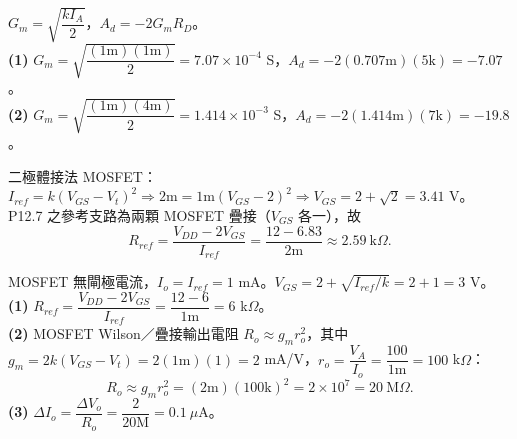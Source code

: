 \documentclass[12pt]{article}
\begin{document}
\sol $G_m=\sqrt{\dfrac{kI_A}{2}}$，$A_d=-2G_mR_D$。\\
\textbf{(1)} $G_m=\sqrt{\dfrac{(1\text{m})(1\text{m})}{2}}=7.07\times10^{-4}$ S，$A_d=-2(0.707\text{m})(5\text{k})=-7.07$。\\
\textbf{(2)} $G_m=\sqrt{\dfrac{(1\text{m})(4\text{m})}{2}}=1.414\times10^{-3}$ S，$A_d=-2(1.414\text{m})(7\text{k})=-19.8$。

\begin{minipage}{0.64\linewidth}
\end{minipage}\hfill
\begin{minipage}{0.33\linewidth}
\end{minipage}

\sol 二極體接法 MOSFET：$I_{ref}=k(V_{GS}-V_t)^2\Rightarrow 2\text{m}=1\text{m}(V_{GS}-2)^2\Rightarrow V_{GS}=2+\sqrt2=3.41$ V。
P12.7 之參考支路為兩顆 MOSFET 疊接（$V_{GS}$ 各一），故
\[ R_{ref}=\frac{V_{DD}-2V_{GS}}{I_{ref}}=\frac{12-6.83}{2\text{m}}\approx2.59\ \text{k}\Omega. \]

\sol MOSFET 無閘極電流，$I_o=I_{ref}=1$ mA。$V_{GS}=2+\sqrt{I_{ref}/k}=2+1=3$ V。\\
\textbf{(1)} $R_{ref}=\dfrac{V_{DD}-2V_{GS}}{I_{ref}}=\dfrac{12-6}{1\text{m}}=6$ k$\Omega$。\\
\textbf{(2)} MOSFET Wilson／疊接輸出電阻 $R_o\approx g_m r_o^2$，其中 $g_m=2k(V_{GS}-V_t)=2(1\text{m})(1)=2$ mA/V，$r_o=\dfrac{V_A}{I_o}=\dfrac{100}{1\text{m}}=100$ k$\Omega$：
\[ R_o\approx g_m r_o^2=(2\text{m})(100\text{k})^2=2\times10^{7}=20\ \text{M}\Omega. \]
\textbf{(3)} $\Delta I_o=\dfrac{\Delta V_o}{R_o}=\dfrac{2}{20\text{M}}=0.1\ \mu$A。

\begin{minipage}{0.64\linewidth}
\end{minipage}\hfill
\begin{minipage}{0.33\linewidth}
\end{minipage}
\end{document}
